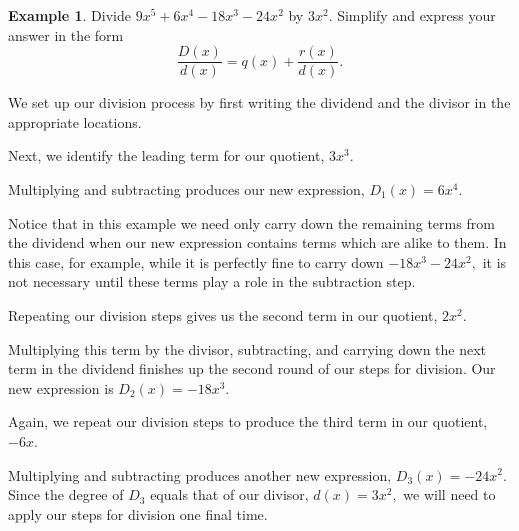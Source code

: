 \documentclass[12pt]{book}
\theoremstyle{definition}
\newtheorem{example}{Example}
\begin{document}
\begin{example} Divide $9x^5+6x^4-18x^3-24x^2$ by $3x^2$.  Simplify and express your answer in the form
$$\frac{D(x)}{d(x)}=q(x)+\dfrac{r(x)}{d(x)}.$$
\begin{multicols}{2}

\columnbreak

We set up our division process by first writing the dividend and the divisor in the appropriate locations.

\end{multicols}
\begin{multicols}{2}

\columnbreak

Next, we identify the leading term for our quotient, $3x^3$.

\end{multicols}
\begin{multicols}{2}

\columnbreak

Multiplying and subtracting produces our new expression, $D_1(x)=6x^4$.
\end{multicols}
Notice that in this example we need only carry down the remaining terms from the dividend when our new expression contains terms which are alike to them.  In this case, for example, while it is perfectly fine to carry down $-18x^3-24x^2,$ it is not necessary until these terms play a role in the subtraction step.
\begin{multicols}{2}



\columnbreak

Repeating our division steps gives us the second term in our quotient, $2x^2$.
\par
Multiplying this term by the divisor, subtracting, and carrying down the next term in the dividend finishes up the second round of our steps for division.  Our new expression is $D_2(x)=-18x^3$.
\par
Again, we repeat our division steps to produce the third term in our quotient, $-6x$.
\par
Multiplying and subtracting produces another new expression, $D_3(x)=-24x^2$.  Since the degree of $D_3$ equals that of our divisor, $d(x)=3x^2,$ we will need to apply our steps for division one final time.
\end{multicols}


\end{example}
\end{document}

